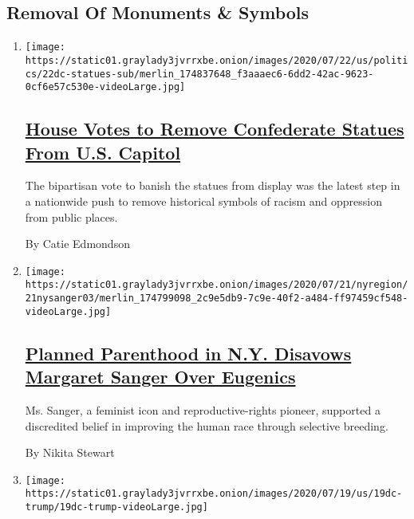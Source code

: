 \hypertarget{removal-of-monuments--symbols}{%
\subsection{Removal Of Monuments \&
Symbols}\label{removal-of-monuments--symbols}}

\begin{enumerate}
\def\labelenumi{\arabic{enumi}.}
\item
  \texttt{[image: https://static01.graylady3jvrrxbe.onion/images/2020/07/22/us/politics/22dc-statues-sub/merlin\_174837648\_f3aaaec6-6dd2-42ac-9623-0cf6e57c530e-videoLarge.jpg]}

  \hypertarget{house-votes-to-remove-confederate-statues-from-us-capitol}{%
  \subsection{\texorpdfstring{\href{/2020/07/22/us/politics/confederate-statues-us-capitol.html}{House
  Votes to Remove Confederate Statues From U.S.
  Capitol}}{House Votes to Remove Confederate Statues From U.S. Capitol}}\label{house-votes-to-remove-confederate-statues-from-us-capitol}}

  The bipartisan vote to banish the statues from display was the latest
  step in a nationwide push to remove historical symbols of racism and
  oppression from public places.

  By Catie Edmondson
\item
  \texttt{[image: https://static01.graylady3jvrrxbe.onion/images/2020/07/21/nyregion/21nysanger03/merlin\_174799098\_2c9e5db9-7c9e-40f2-a484-ff97459cf548-videoLarge.jpg]}

  \hypertarget{planned-parenthood-in-ny-disavows-margaret-sanger-over-eugenics}{%
  \subsection{\texorpdfstring{\href{/2020/07/21/nyregion/planned-parenthood-margaret-sanger-eugenics.html}{Planned
  Parenthood in N.Y. Disavows Margaret Sanger Over
  Eugenics}}{Planned Parenthood in N.Y. Disavows Margaret Sanger Over Eugenics}}\label{planned-parenthood-in-ny-disavows-margaret-sanger-over-eugenics}}

  Ms. Sanger, a feminist icon and reproductive-rights pioneer, supported
  a discredited belief in improving the human race through selective
  breeding.

  By Nikita Stewart
\item
  \texttt{[image: https://static01.graylady3jvrrxbe.onion/images/2020/07/19/us/19dc-trump/19dc-trump-videoLarge.jpg]}


\end{enumerate}
